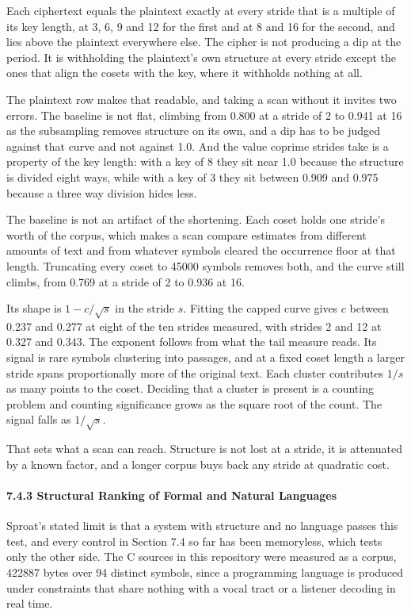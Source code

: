 Each ciphertext equals the plaintext exactly at every stride that is a multiple of its key length, at 3, 6, 9 and 12 for the first and at 8 and 16 for the second, and lies above the plaintext everywhere else. The cipher is not producing a dip at the period. It is withholding the plaintext's own structure at every stride except the ones that align the cosets with the key, where it withholds nothing at all.

The plaintext row makes that readable, and taking a scan without it invites two errors. The baseline is not flat, climbing from 0.800 at a stride of 2 to 0.941 at 16 as the subsampling removes structure on its own, and a dip has to be judged against that curve and not against 1.0. And the value coprime strides take is a property of the key length: with a key of 8 they sit near 1.0 because the structure is divided eight ways, while with a key of 3 they sit between 0.909 and 0.975 because a three way division hides less.

The baseline is not an artifact of the shortening. Each coset holds one stride's worth of the corpus, which makes a scan compare estimates from different amounts of text and from whatever symbols cleared the occurrence floor at that length. Truncating every coset to 45000 symbols removes both, and the curve still climbs, from 0.769 at a stride of 2 to 0.936 at 16.

Its shape is \(1 - c/\sqrt{s}\) in the stride \(s\). Fitting the capped curve gives \(c\) between 0.237 and 0.277 at eight of the ten strides measured, with strides 2 and 12 at 0.327 and 0.343. The exponent follows from what the tail measure reads. Its signal is rare symbols clustering into passages, and at a fixed coset length a larger stride spans proportionally more of the original text. Each cluster contributes \(1/s\) as many points to the coset. Deciding that a cluster is present is a counting problem and counting significance grows as the square root of the count. The signal falls as \(1/\sqrt{s}\).

That sets what a scan can reach. Structure is not lost at a stride, it is attenuated by a known factor, and a longer corpus buys back any stride at quadratic cost.

\paragraph{7.4.3 Structural Ranking of Formal and Natural Languages}

Sproat's stated limit is that a system with structure and no language passes this test, and every control in Section 7.4 so far has been memoryless, which tests only the other side. The C sources in this repository were measured as a corpus, 422887 bytes over 94 distinct symbols, since a programming language is produced under constraints that share nothing with a vocal tract or a listener decoding in real time.

